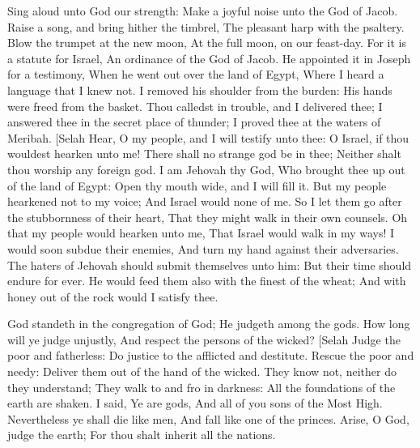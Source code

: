 Sing aloud unto God our strength: Make a joyful noise unto the God of Jacob.  Raise a song, and bring hither the timbrel, The pleasant harp with the psaltery.  Blow the trumpet at the new moon, At the full moon, on our feast-day.  For it is a statute for Israel, An ordinance of the God of Jacob.  He appointed it in Joseph for a testimony, When he went out over the land of Egypt, Where I heard a language that I knew not.  I removed his shoulder from the burden: His hands were freed from the basket.  Thou calledst in trouble, and I delivered thee; I answered thee in the secret place of thunder; I proved thee at the waters of Meribah. [Selah  Hear, O my people, and I will testify unto thee: O Israel, if thou wouldest hearken unto me!  There shall no strange god be in thee; Neither shalt thou worship any foreign god.  I am Jehovah thy God, Who brought thee up out of the land of Egypt: Open thy mouth wide, and I will fill it.  But my people hearkened not to my voice; And Israel would none of me.  So I let them go after the stubbornness of their heart, That they might walk in their own counsels.  Oh that my people would hearken unto me, That Israel would walk in my ways!  I would soon subdue their enemies, And turn my hand against their adversaries.  The haters of Jehovah should submit themselves unto him: But their time should endure for ever.  He would feed them also with the finest of the wheat; And with honey out of the rock would I satisfy thee. 

God standeth in the congregation of God; He judgeth among the gods.  How long will ye judge unjustly, And respect the persons of the wicked? [Selah  Judge the poor and fatherless: Do justice to the afflicted and destitute.  Rescue the poor and needy: Deliver them out of the hand of the wicked.  They know not, neither do they understand; They walk to and fro in darkness: All the foundations of the earth are shaken.  I said, Ye are gods, And all of you sons of the Most High.  Nevertheless ye shall die like men, And fall like one of the princes.  Arise, O God, judge the earth; For thou shalt inherit all the nations. 

